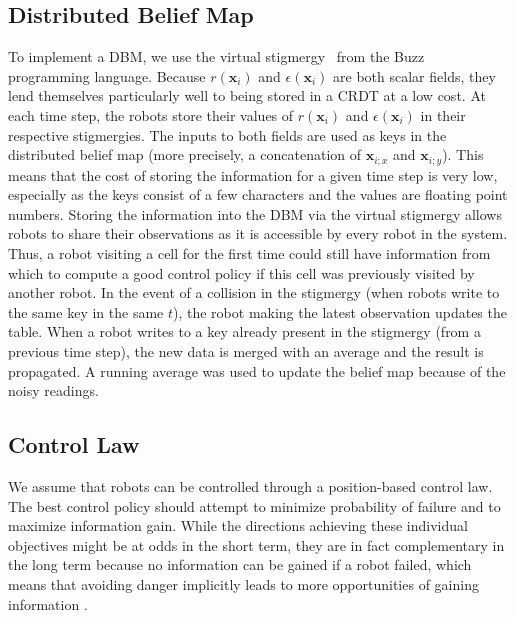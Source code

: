 \subsection{Distributed Belief Map}
To implement a DBM, we use the virtual
stigmergy~\cite{pinciroliTuple2016} from the
Buzz~\cite{pinciroliBuzz2016} programming language. Because
$r(\bm{x}_i)$ and $\epsilon(\bm{x}_i)$ are both scalar fields, they
lend themselves particularly well to being stored in a CRDT at a low
cost. At each time step, the robots store their values of
$r(\bm{x}_i)$ and $\epsilon(\bm{x}_i)$ in their respective
stigmergies.  The inputs to both fields are used as keys in the distributed belief map (more precisely, a concatenation of $\bm{x}_{i;x}$ and $\bm{x}_{i;y}$). This
means that the cost of storing the information for a given time step
is very low, especially as the keys consist of a few characters and
the values are floating point numbers. Storing the information into
the DBM via the virtual stigmergy allows robots to share their
observations as it is accessible by every robot in the system. Thus, a
robot visiting a cell for the first time could still have information from
which to compute a good control policy if this cell was previously
visited by another robot. In the event of a collision in the stigmergy
(when robots write to the same key in the same $t$), the robot making the latest observation updates the table. When a robot writes to a key already present
in the stigmergy (from a previous time step), the new data is merged
with an average and the result is propagated. A running average was used to update the belief map because of the noisy readings. 

\subsection{Control Law}
We assume that robots can be controlled through a position-based
control law. The best control policy should attempt to minimize
probability of failure and to maximize information gain. While the
directions achieving these individual objectives might be at odds in
the short term, they are in fact complementary in the long term
because no information can be gained if a robot failed, which means that avoiding danger
implicitly leads to more opportunities of gaining information
\cite{schwagerMultirobotControlPolicy2017}.

